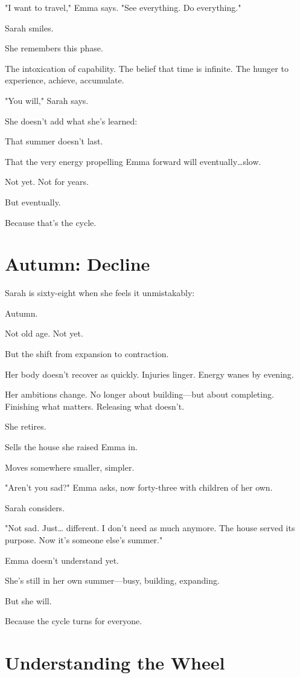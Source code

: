 \documentclass[11pt,twoside]{book}
\begin{document}
"I want to travel," Emma says. "See everything. Do everything."

Sarah smiles.

She remembers this phase.

The intoxication of capability. The belief that time is infinite. The hunger to experience, achieve, accumulate.

"You will," Sarah says.

She doesn't add what she's learned:

That summer doesn't last.

That the very energy propelling Emma forward will eventually\ldots{}slow.

Not yet. Not for years.

But eventually.

Because that's the cycle.

\section*{Autumn: Decline}

Sarah is sixty-eight when she feels it unmistakably:

Autumn.

Not old age. Not yet.

But the shift from expansion to contraction.

Her body doesn't recover as quickly. Injuries linger. Energy wanes by evening.

Her ambitions change. No longer about building—but about completing. Finishing what matters. Releasing what doesn't.

She retires.

Sells the house she raised Emma in.

Moves somewhere smaller, simpler.

"Aren't you sad?" Emma asks, now forty-three with children of her own.

Sarah considers.

"Not sad. Just\ldots{} different. I don't need as much anymore. The house served its purpose. Now it's someone else's summer."

Emma doesn't understand yet.

She's still in her own summer—busy, building, expanding.

But she will.

Because the cycle turns for everyone.

\section*{Understanding the Wheel}
\end{document}
